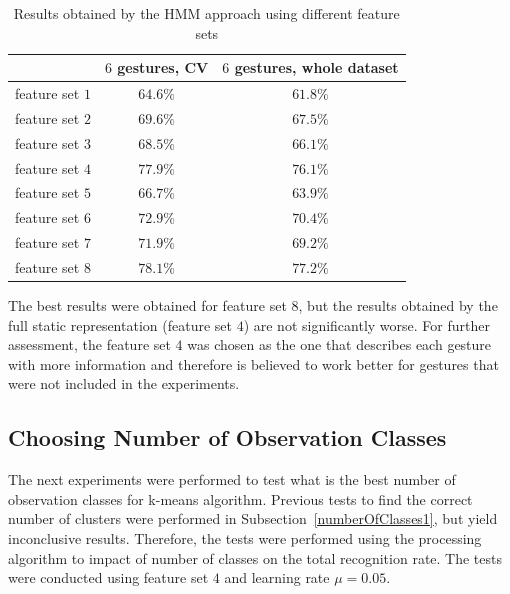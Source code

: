 \begin{table}[htbp!]
\begin{center}
	\label{tab:dyn1}
	\caption{Results obtained by the HMM approach using different feature sets}
    \begin{tabular}{ccc}
    \hline
    ~                                 & $6$ gestures, CV & $6$ gestures, whole dataset  \\ \hline \hline
    feature set $1$                     & $64.6\%$ & $61.8\%$   \\ \hline
    feature set $2$                     & $69.6\%$ & $67.5\%$   \\ \hline
    feature set $3$                     & $68.5\%$ & $66.1\%$   \\ \hline
    feature set $4$          		  & $77.9\%$ & $76.1\%$   \\ \hline
    feature set $5$                     & $66.7\%$ & $63.9\%$   \\ \hline
    feature set $6$                    & $72.9\%$ & $70.4\%$   \\ \hline
    feature set $7$                    & $71.9\%$ & $69.2\%$   \\ \hline
    feature set $8$                    & $78.1\%$ & $77.2\%$   \\ \hline
    \end{tabular}
\end{center}
\end{table}
  
The best results were obtained for feature set $8$, but the results obtained by the full static representation (feature set $4$) are not significantly worse.
For further assessment, the feature set $4$ was chosen as the one that describes each gesture with more information and therefore is believed to work better for gestures that were not included in the experiments.

\subsection{Choosing Number of Observation Classes} 

The next experiments were performed to test what is the best number of observation classes for k-means algorithm. 
Previous tests to find the correct number of clusters were performed in Subsection~\ref{numberOfClasses1}, but yield inconclusive results.
Therefore, the tests were performed using the processing algorithm to impact of number of classes on the total recognition rate.
The tests were conducted using feature set $4$ and learning rate $\mu=0.05$.

